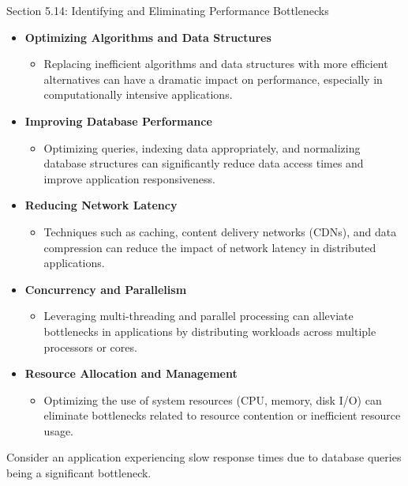 \begin{notes}{Section 5.14: Identifying and Eliminating Performance Bottlenecks}
    \begin{itemize}
        \item \textbf{Optimizing Algorithms and Data Structures}
        \begin{itemize}
            \item Replacing inefficient algorithms and data structures with more efficient alternatives can have a dramatic impact on performance, especially in computationally intensive applications.
        \end{itemize}
        \item \textbf{Improving Database Performance}
        \begin{itemize}
            \item Optimizing queries, indexing data appropriately, and normalizing database structures can significantly reduce data access times and improve application responsiveness.
        \end{itemize}
        \item \textbf{Reducing Network Latency}
        \begin{itemize}
            \item Techniques such as caching, content delivery networks (CDNs), and data compression can reduce the impact of network latency in distributed applications.
        \end{itemize}
        \item \textbf{Concurrency and Parallelism}
        \begin{itemize}
            \item Leveraging multi-threading and parallel processing can alleviate bottlenecks in applications by distributing workloads across multiple processors or cores.
        \end{itemize}
        \item \textbf{Resource Allocation and Management}
        \begin{itemize}
            \item Optimizing the use of system resources (CPU, memory, disk I/O) can eliminate bottlenecks related to resource contention or inefficient resource usage.
        \end{itemize}
    \end{itemize}
    
    \begin{highlight}
        Consider an application experiencing slow response times due to database queries being a significant bottleneck.
    

\end{highlight}
\end{notes}
